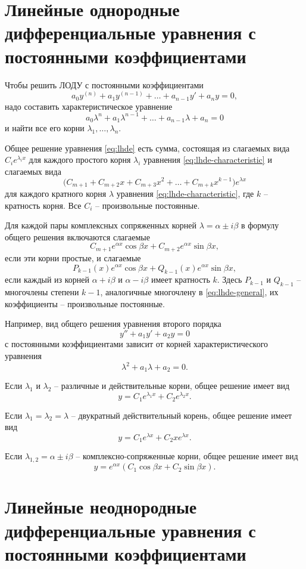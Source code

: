 \documentclass[a5paper, 11pt]{extbook}
\theoremstyle{definition}
\theoremstyle{definition}
\begin{document}
\section{Линейные однородные дифференциальные уравнения с постоянными коэффициентами}

Чтобы решить ЛОДУ с постоянными коэффициентами
\begin{equation}
    \label{eq:lhde}
    a_0 y^{(n)} + a_1 y^{(n - 1)} + \ldots + a_{n - 1} y' + a_n y = 0,
\end{equation}
надо составить характеристическое уравнение
\begin{equation}
    \label{eq:lhde-characteristic}
    a_0 \lambda^n + a_1 \lambda^{n - 1} + \ldots + a_{n - 1} \lambda + a_n = 0
\end{equation}
и найти все его корни \(\lambda_1, \ldots, \lambda_n\).

Общее решение уравнения \eqref{eq:lhde} есть сумма, состоящая из слагаемых вида \(C_i e^{\lambda_i x}\) для каждого простого корня \(\lambda_i\) уравнения \eqref{eq:lhde-characteristic} и слагаемых вида
\begin{equation}
    \label{eq:lhde-general}
    \big( C_{m + 1} + C_{m + 2}x + C_{m + 3}x^2 + \ldots + C_{m + k} x^{k - 1} \big) e^{\lambda x}
\end{equation}
для каждого кратного корня \(\lambda\) уравнения \eqref{eq:lhde-characteristic}, где \(k\) -- кратность корня. Все \(C_i\) -- произвольные постоянные.

Для каждой пары комплексных сопряженных корней \(\lambda = \alpha \pm i \beta\) в формулу общего решения включаются слагаемые
\[
    C_{m + 1} e^{\alpha x} \cos \beta x + C_{m + 2} e^{\alpha x} \sin \beta x,
\]
если эти корни простые, и слагаемые
\[
    P_{k - 1}(x) e^{\alpha x} \cos{\beta x} + Q_{k - 1}(x) e^{\alpha x} \sin{\beta x},
\]
если каждый из корней \(\alpha + i \beta\) и \(\alpha - i \beta\) имеет кратность \(k\). Здесь \(P_{k - 1}\) и \(Q_{k - 1}\) -- многочлены степени \(k - 1\), аналогичные многочлену в \eqref{eq:lhde-general}, их коэффициенты -- произвольные постоянные.

Например, вид общего решения уравнения второго порядка
\[
    y'' + a_1 y' + a_2 y = 0
\]
с постоянными коэффициентами зависит от корней характеристического уравнения
\[
    \lambda^2 + a_1 \lambda + a_2 = 0.
\]

Если \(\lambda_1\) и \(\lambda_2\) -- различные и действительные корни, общее решение имеет вид
\[
    y = C_1 e^{\lambda_1 x} + C_2 e^{\lambda_2 x}.
\]

Если \(\lambda_1 = \lambda_2 = \lambda\) -- двукратный действительный корень, общее решение имеет вид
\[
    y = C_1 e^{\lambda x} + C_2 x e^{\lambda x}.
\]

Если \(\lambda_{1, 2} = \alpha \pm i \beta\) -- комплексно-сопряженные корни, общее решение имеет вид
\[
    y = e^{\alpha x} (C_1 \cos \beta x + C_2 \sin \beta x).
\]

\section{Линейные неоднородные дифференциальные уравнения с постоянными коэффициентами}

\end{document}
